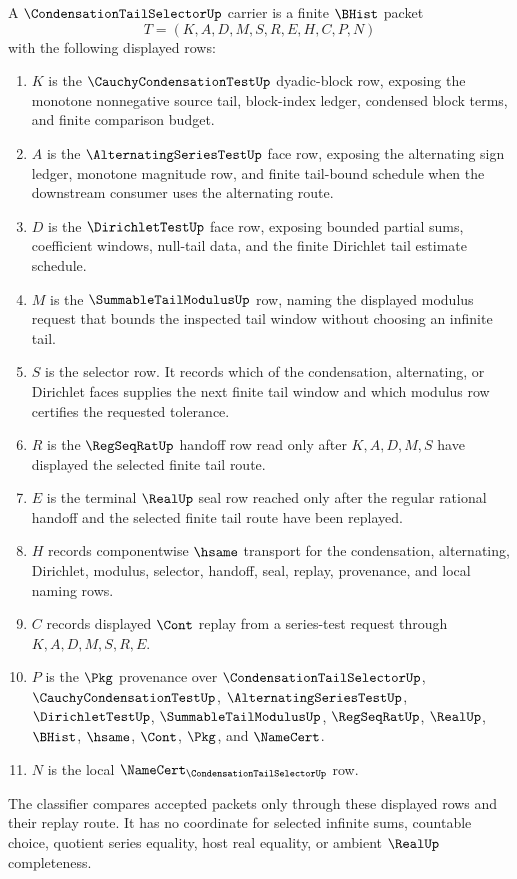 \begin{definition}
\label{def:condensation-tail-selector-carrier}
A $\CondensationTailSelectorUp$ carrier is a finite $\BHist$ packet
$$
T=(K,A,D,M,S,R,E,H,C,P,N)
$$
with the following displayed rows:
\begin{enumerate}
\item $K$ is the $\CauchyCondensationTestUp$ dyadic-block row, exposing the monotone nonnegative source tail, block-index ledger, condensed block terms, and finite comparison budget.
\item $A$ is the $\AlternatingSeriesTestUp$ face row, exposing the alternating sign ledger, monotone magnitude row, and finite tail-bound schedule when the downstream consumer uses the alternating route.
\item $D$ is the $\DirichletTestUp$ face row, exposing bounded partial sums, coefficient windows, null-tail data, and the finite Dirichlet tail estimate schedule.
\item $M$ is the $\SummableTailModulusUp$ row, naming the displayed modulus request that bounds the inspected tail window without choosing an infinite tail.
\item $S$ is the selector row. It records which of the condensation, alternating, or Dirichlet faces supplies the next finite tail window and which modulus row certifies the requested tolerance.
\item $R$ is the $\RegSeqRatUp$ handoff row read only after $K,A,D,M,S$ have displayed the selected finite tail route.
\item $E$ is the terminal $\RealUp$ seal row reached only after the regular rational handoff and the selected finite tail route have been replayed.
\item $H$ records componentwise $\hsame$ transport for the condensation, alternating, Dirichlet, modulus, selector, handoff, seal, replay, provenance, and local naming rows.
\item $C$ records displayed $\Cont$ replay from a series-test request through $K,A,D,M,S,R,E$.
\item $P$ is the $\Pkg$ provenance over $\CondensationTailSelectorUp$, $\CauchyCondensationTestUp$, $\AlternatingSeriesTestUp$, $\DirichletTestUp$, $\SummableTailModulusUp$, $\RegSeqRatUp$, $\RealUp$, $\BHist$, $\hsame$, $\Cont$, $\Pkg$, and $\NameCert$.
\item $N$ is the local $\NameCert_{\CondensationTailSelectorUp}$ row.
\end{enumerate}
The classifier compares accepted packets only through these displayed rows and their replay route. It has no coordinate for selected infinite sums, countable choice, quotient series equality, host real equality, or ambient $\RealUp$ completeness.
\end{definition}

